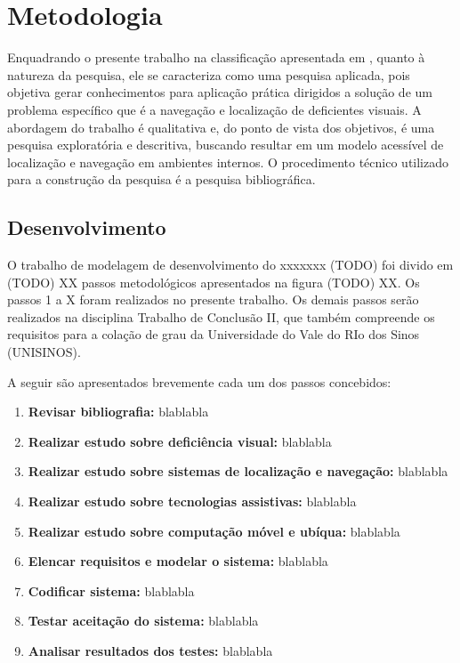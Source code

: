 \documentclass[english,brazilian]{UNISINOSmonografia}
\begin{document}
\chapter{Metodologia}
Enquadrando o presente trabalho na classificação apresentada em , quanto à natureza da pesquisa, ele se caracteriza como uma pesquisa aplicada, pois objetiva gerar conhecimentos para aplicação prática dirigidos a solução de um problema específico que é a navegação e localização de deficientes visuais. A abordagem do trabalho é qualitativa e, do ponto de vista dos objetivos, é uma pesquisa exploratória e descritiva, buscando resultar em um modelo acessível de localização e navegação em ambientes internos. O procedimento técnico utilizado para a construção da pesquisa é a pesquisa bibliográfica.

	\section{Desenvolvimento}
O trabalho de modelagem de desenvolvimento do xxxxxxx (TODO) foi divido em (TODO) XX passos metodológicos apresentados na figura (TODO) XX. Os passos 1 a X foram realizados no presente trabalho. Os demais passos serão realizados na disciplina Trabalho de Conclusão II, que também compreende os requisitos para a colação de grau da Universidade do Vale do RIo dos Sinos (UNISINOS).

A seguir são apresentados brevemente cada um dos passos concebidos:

\begin{enumerate}
	\item \textbf{Revisar bibliografia:} blablabla
    \item \textbf{Realizar estudo sobre deficiência visual:} blablabla
    \item \textbf{Realizar estudo sobre sistemas de localização e navegação:} blablabla
    \item \textbf{Realizar estudo sobre tecnologias assistivas:} blablabla
    \item \textbf{Realizar estudo sobre computação móvel e ubíqua:} blablabla
    \item \textbf{Elencar requisitos e modelar o sistema:} blablabla
    \item \textbf{Codificar sistema:} blablabla
	\item \textbf{Testar aceitação do sistema:} blablabla	
	\item \textbf{Analisar resultados dos testes:} blablabla
\end{enumerate}
\end{document}
